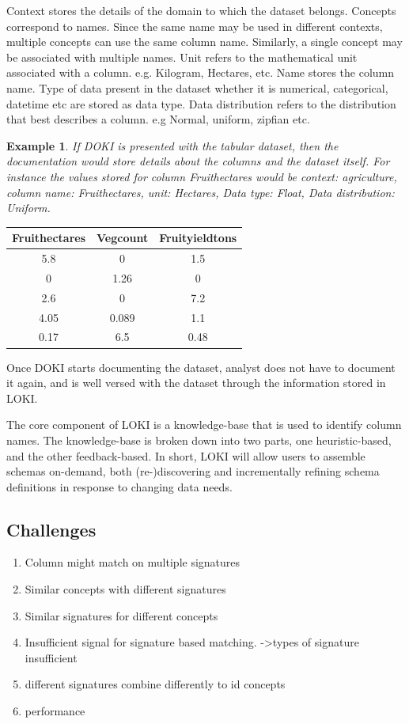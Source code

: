 \documentclass{vldb}
\begin{document}
Context stores the details of the domain to which the dataset belongs. Concepts correspond to names. Since the same name may be used in different contexts, multiple concepts can use the same column name. Similarly, a single concept may be associated with multiple names.
Unit refers to the mathematical unit associated with a column. e.g. Kilogram, Hectares, etc. Name stores the column name. Type of data present in the dataset whether it is numerical, categorical, datetime etc are stored as data type. Data distribution refers to the distribution that best describes a column. e.g Normal, uniform, zipfian etc.

\newtheorem{exmp}{Example}[section]
\begin{exmp}
	If DOKI is presented with the tabular dataset, then the documentation would store details about the columns and the dataset itself. For instance the values stored for column Fruithectares would be context: agriculture, column name: Fruithectares, unit: Hectares, Data type: Float, Data distribution: Uniform.
\end{exmp}

\begin{center}
	\begin{tabular}{||c c c||} 
		\hline
		Fruithectares & Vegcount & Fruityieldtons \\ [0.5ex]
		\hline\hline
		5.8 & 0 & 1.5 \\ 
		\hline
		0 & 1.26 & 0 \\
		\hline
		2.6 & 0 & 7.2 \\
		\hline
		4.05 & 0.089 & 1.1 \\
		\hline
		0.17 & 6.5 & 0.48 \\ [1ex] 
		\hline
	\end{tabular}
\end{center}

Once DOKI starts documenting the dataset, analyst does not have to document it again, and is well versed with the dataset through the information stored in LOKI. 

The core component of LOKI is a knowledge-base that is used to identify column names. The knowledge-base is broken down into two parts, one heuristic-based, and the other feedback-based. In short, LOKI will allow users to assemble schemas on-demand, both (re-)discovering and incrementally refining schema definitions in response to changing data needs. 

\subsection{Challenges}
\begin{enumerate}
	\item Column might match on multiple signatures
	\item Similar concepts with different signatures
	\item Similar signatures for different concepts
	\item Insufficient signal for signature based matching.
	->types of signature insufficient
	\item different signatures combine differently to id concepts
	\item performance
\end{enumerate}
\end{document}

